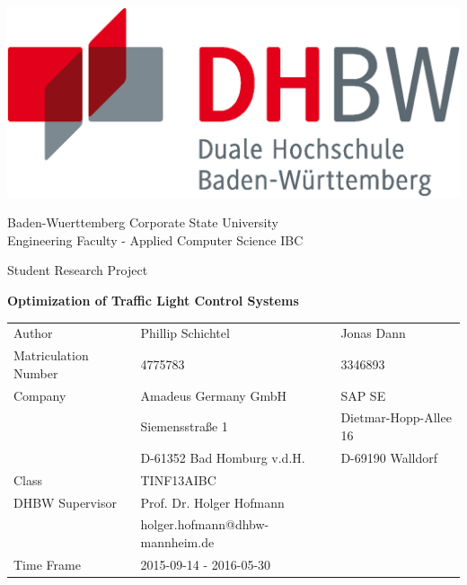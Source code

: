 \thispagestyle{empty}

\includegraphics[scale=0.3]{resources/dhbw_logo.eps} \\

\begin{center}

\vspace{0.5cm}

{\large Baden-Wuerttemberg Corporate State University}\\
{\large Engineering Faculty - Applied Computer Science IBC}\\

\vspace{0.5cm}

{\large Student Research Project}\\

\vspace{1cm}

{\large \textbf{Optimization of Traffic Light Control Systems}}

\vspace{1.5cm}

\begin{tabular}{lll}
Author				& Phillip Schichtel & Jonas Dann \\
Matriculation Number& 4775783 & 3346893 \\
Company				& Amadeus Germany GmbH & SAP SE \\
					& Siemensstraße 1 & Dietmar-Hopp-Allee 16 \\
					& D-61352 Bad Homburg v.d.H. & D-69190 Walldorf \\
Class				& TINF13AIBC & \\
DHBW Supervisor	    & Prof. Dr. Holger Hofmann & \\
					& holger.hofmann@dhbw-mannheim.de & \\
Time Frame			& 2015-09-14 - 2016-05-30 & \\
\end{tabular}

\vspace{0.5cm}
\vspace{0.5cm}

\end{center}

\newpage